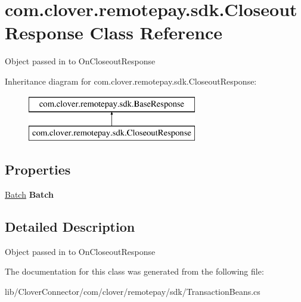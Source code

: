 \hypertarget{classcom_1_1clover_1_1remotepay_1_1sdk_1_1_closeout_response}{}\section{com.\+clover.\+remotepay.\+sdk.\+Closeout\+Response Class Reference}
\label{classcom_1_1clover_1_1remotepay_1_1sdk_1_1_closeout_response}


Object passed in to On\+Closeout\+Response  


Inheritance diagram for com.\+clover.\+remotepay.\+sdk.\+Closeout\+Response\+:\begin{figure}[H]
\begin{center}
\leavevmode
\includegraphics[height=2.000000cm]{classcom_1_1clover_1_1remotepay_1_1sdk_1_1_closeout_response}
\end{center}
\end{figure}
\subsection*{Properties}
\begin{DoxyCompactItemize}
\item 
\mbox{\label{classcom_1_1clover_1_1remotepay_1_1sdk_1_1_closeout_response_a738d2647e57079c997ca44d5ac5317e1}} 
\hyperlink{classcom_1_1clover_1_1sdk_1_1v3_1_1payments_1_1_batch}{Batch} {\bfseries Batch}
\end{DoxyCompactItemize}


\subsection{Detailed Description}
Object passed in to On\+Closeout\+Response 



The documentation for this class was generated from the following file\+:\begin{DoxyCompactItemize}
\item 
lib/\+Clover\+Connector/com/clover/remotepay/sdk/Transaction\+Beans.\+cs\end{DoxyCompactItemize}
